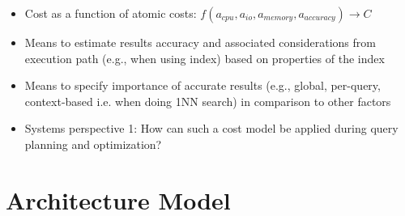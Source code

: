 \begin{itemize}
    \item Cost as a function of atomic costs: $f(a_{cpu}, a_{io}, a_{memory}, a_{accuracy}) \longrightarrow C$
    \item Means to estimate results accuracy and associated considerations from execution path (e.g., when using index) based on properties of the index
    \item Means to specify importance of accurate results (e.g., global, per-query, context-based i.e. when doing 1NN search) in comparison to other factors
    \item Systems perspective 1: How can such a cost model be applied during query planning and optimization?
\end{itemize}

\section{Architecture Model}





